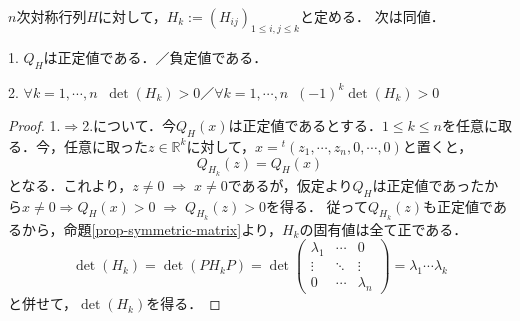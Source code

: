 \documentclass[uplatex, dvipdfmx]{jsreport}
\begin{document}
\begin{shadebox}\begin{proposition}[正方行列の正定値性の判定法]\label{prop-positive-definite}
    $n$次対称行列$H$に対して，$H_k:=(H_{ij})_{1\le i,j\le k}$と定める．
    次は同値．

    1. $Q_H$は正定値である．／負定値である．

    2. $\forall k=1,\cdots,n\;\;\det(H_k)>0$／$\forall k=1,\cdots,n\;\;(-1)^k\det(H_k)>0$
\end{proposition}\end{shadebox}
\begin{proof}
    1.$\Rightarrow$2.について．今$Q_H(x)$は正定値であるとする．$1\le k\le n$を任意に取る．今，任意に取った$z\in\mathbb{R}^k$に対して，$x={}^t(z_1,\cdots,z_n,0,\cdots,0)$と置くと，
    \[Q_{H_k}(z)=Q_H(x)\]
    となる．これより，$z\ne 0\;\Rightarrow\; x\ne 0$であるが，仮定より$Q_H$は正定値であったから$x\ne 0\Rightarrow Q_H(x)>0\;\Rightarrow\; Q_{H_k}(z)> 0$を得る．
    従って$Q_{H_k}(z)$も正定値であるから，命題\ref{prop-symmetric-matrix}より，$H_k$の固有値は全て正である．
    \[ \det(H_k)=\det(PH_kP)=\det\left(\begin{array}{lcr}\lambda_1 &\cdots &0 \\ \vdots & \ddots &\vdots \\ 0&\cdots&\lambda_n\end{array}\right)=\lambda_1\cdots\lambda_k \]
    と併せて，$\det(H_k)$を得る．


\end{proof}
\end{document}
